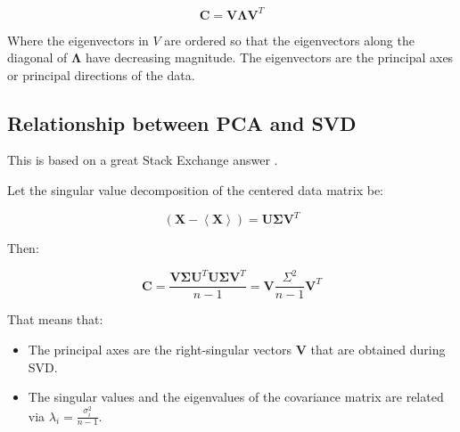 \begin{equation}
\mathbf{C} = \mathbf{V}\mathbf{\Lambda}\mathbf{V}^T
\end{equation}

Where the eigenvectors in $V$ are ordered so that the eigenvectors along the diagonal of $\mathbf{\Lambda}$ have decreasing magnitude. The eigenvectors are the principal axes or principal directions of the data.




\subsection{Relationship between PCA and SVD}
\label{sec:pcasvd}
This is based on a great Stack Exchange answer \cite{amoeba2015svdpca}.

Let the singular value decomposition of the centered data matrix be:

\begin{equation}
\left(\mathbf{X}-\left<\mathbf{X}\right>\right) = \mathbf{U}\mathbf{\Sigma}\mathbf{V}^T
\end{equation}

Then:

\begin{equation}
\mathbf{C} = \frac{\mathbf{V\Sigma U}^T\mathbf{U\Sigma V}^T}{n-1} = \mathbf{V}\frac{\Sigma^2}{n-1}\mathbf{V}^T
\end{equation}

That means that:

\begin{itemize}
\item The principal axes are the right-singular vectors $\mathbf{V}$ that are obtained during SVD.
\item The singular values and the eigenvalues of the covariance matrix are related via $\lambda_i = \frac{\sigma_i^2}{n-1}$.
\end{itemize}

